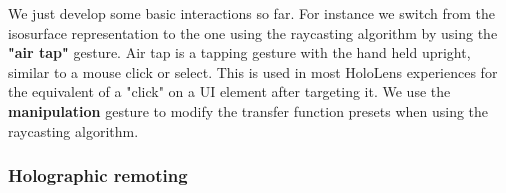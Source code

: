 We just develop some basic interactions so far. For instance we switch from the isosurface representation to the one using the raycasting algorithm by using the \textbf{"air tap"} gesture. Air tap is a tapping gesture with the hand held upright, similar to a mouse click or select. This is used in most HoloLens experiences for the equivalent of a "click" on a UI element after targeting it.  We use the \textbf{manipulation} gesture to modify the transfer function presets when using the raycasting algorithm.

\subsubsection{ Holographic remoting }